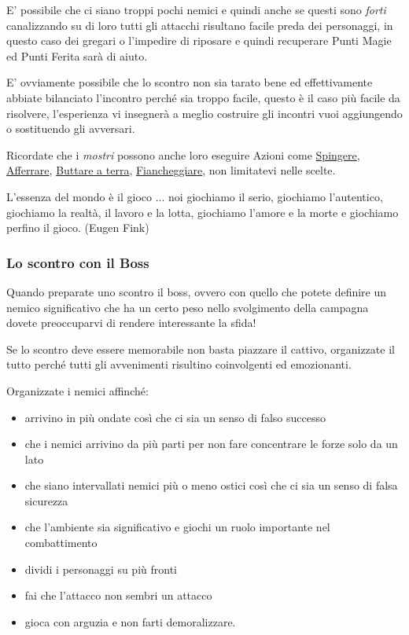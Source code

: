 \begin{multicols}{2}
E' possibile che ci siano troppi pochi nemici e quindi anche se questi sono \emph{forti} canalizzando su di loro tutti gli attacchi risultano facile preda dei personaggi, in questo caso dei gregari o l'impedire di riposare e quindi recuperare Punti Magie ed Punti Ferita sarà di aiuto.

E' ovviamente possibile che lo scontro non sia tarato bene ed effettivamente abbiate bilanciato l'incontro perché sia troppo facile, questo è il caso più facile da risolvere, l'esperienza vi insegnerà a meglio costruire gli incontri vuoi aggiungendo o sostituendo gli avversari.

Ricordate che i \emph{mostri} possono anche loro eseguire Azioni come \hyperlink{spingereavversario}{Spingere}, \hyperlink{afferrareunavversario}{Afferrare}, \hyperlink{farecadereavversario}{Buttare a terra}, \hyperlink{fiancheggiare}{Fiancheggiare}, non limitatevi nelle scelte.

\begin{changemargin}{0.3cm}{0.3cm}\begin{enfasi}{
L'essenza del mondo è il gioco ... noi giochiamo il serio, giochiamo l'autentico, giochiamo la realtà, il lavoro e la lotta, giochiamo l'amore e la morte e giochiamo perfino il gioco. (Eugen Fink)
}\end{enfasi}\end{changemargin}

\subsubsection{Lo scontro con il Boss}

Quando preparate uno scontro il boss, ovvero con quello che potete definire un nemico significativo che ha un certo peso nello svolgimento della campagna dovete preoccuparvi di rendere interessante la sfida!

Se lo scontro deve essere memorabile non basta piazzare il cattivo, organizzate il tutto perché tutti gli avvenimenti risultino coinvolgenti ed emozionanti.

Organizzate i nemici affinché:

\begin{itemize}[leftmargin=*] \setlength{\itemsep}{-1pt}

\item arrivino in più ondate così che ci sia un senso di falso successo
\item che i nemici arrivino da più parti per non fare concentrare le forze solo da un lato
\item che siano intervallati nemici più o meno ostici così che ci sia un senso di falsa sicurezza
\item che l'ambiente sia significativo e giochi un ruolo importante nel combattimento
\item dividi i personaggi su più fronti
\item fai che l'attacco non sembri un attacco
\item gioca con arguzia e non farti demoralizzare.
\end{itemize}


\end{multicols}

